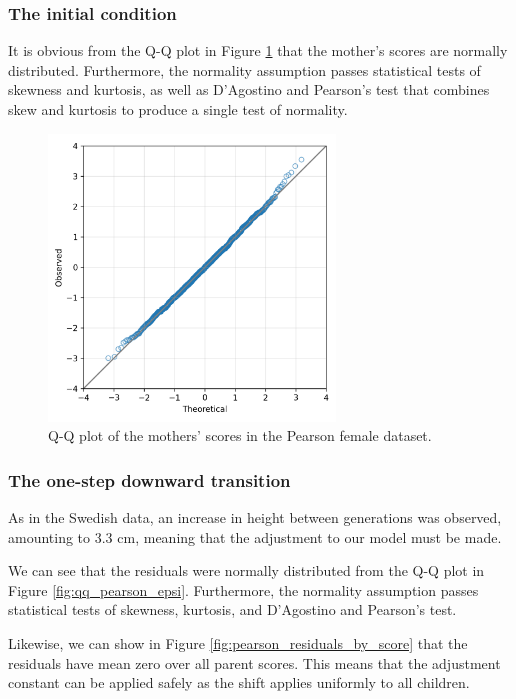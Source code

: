 \documentclass[a4paper,11pt]{article} %
\begin{document}
\subsubsection*{The initial condition}

It is obvious from the Q-Q plot in Figure \ref{fig:qq_pearson_x} that the mother's scores are normally distributed. Furthermore, the normality assumption passes statistical tests of skewness and kurtosis, as well as D’Agostino and Pearson's test that combines skew and kurtosis to produce a single test of normality.

\begin{figure}[h]
\includegraphics[width=3in]{figures/qq_pearson_x.png}
\centering
\caption{Q-Q plot of the mothers' scores in the Pearson female dataset.}
\label{fig:qq_pearson_x}
\end{figure}


\subsubsection*{The one-step downward transition}

As in the Swedish data, an increase in height between generations was observed, amounting to 3.3 cm, meaning that the adjustment to our model must be made. 

We can see that the residuals were normally distributed from the Q-Q plot in Figure \ref{fig:qq_pearson_epsi}. Furthermore, the normality assumption passes statistical tests of skewness, kurtosis, and D’Agostino and Pearson's test.

Likewise, we can show in Figure \ref{fig:pearson_residuals_by_score} that the residuals have mean zero over all parent scores. This means that the adjustment constant can be applied safely as the shift applies uniformly to all children. 
\end{document}
